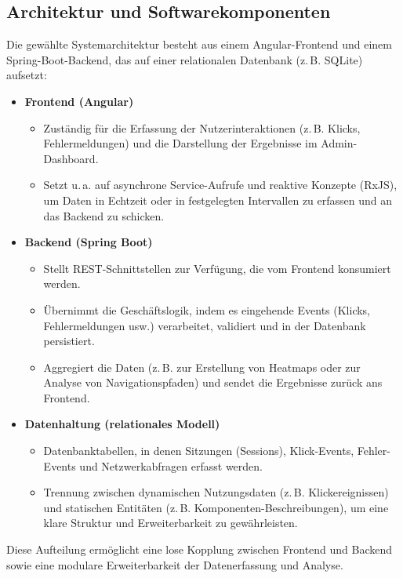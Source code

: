 \documentclass[12pt,oneside]{article}
\begin{document}
\subsection{Architektur und Softwarekomponenten}

Die gewählte Systemarchitektur besteht aus einem Angular-Frontend und einem Spring-Boot-Backend, das auf einer relationalen Datenbank (z.\,B. SQLite) aufsetzt:

\begin{itemize}
    \item \textbf{Frontend (Angular)}
    \begin{itemize}
        \item Zuständig für die Erfassung der Nutzerinteraktionen (z.\,B. Klicks, Fehlermeldungen) und die Darstellung der Ergebnisse im Admin-Dashboard.
        \item Setzt u.\,a. auf asynchrone Service-Aufrufe und reaktive Konzepte (RxJS), um Daten in Echtzeit oder in festgelegten Intervallen zu erfassen und an das Backend zu schicken.
    \end{itemize}
    \item \textbf{Backend (Spring Boot)}
    \begin{itemize}
        \item Stellt REST-Schnittstellen zur Verfügung, die vom Frontend konsumiert werden.
        \item Übernimmt die Geschäftslogik, indem es eingehende Events (Klicks, Fehlermeldungen usw.) verarbeitet, validiert und in der Datenbank persistiert.
        \item Aggregiert die Daten (z.\,B. zur Erstellung von Heatmaps oder zur Analyse von Navigationspfaden) und sendet die Ergebnisse zurück ans Frontend.
    \end{itemize}
    \item \textbf{Datenhaltung (relationales Modell)}
    \begin{itemize}
        \item Datenbanktabellen, in denen Sitzungen (Sessions), Klick-Events, Fehler-Events und Netzwerkabfragen erfasst werden.
        \item Trennung zwischen dynamischen Nutzungsdaten (z.\,B. Klickereignissen) und statischen Entitäten (z.\,B. Komponenten-Beschreibungen), um eine klare Struktur und Erweiterbarkeit zu gewährleisten.
    \end{itemize}
\end{itemize}

Diese Aufteilung ermöglicht eine lose Kopplung zwischen Frontend und Backend sowie eine modulare Erweiterbarkeit der Datenerfassung und Analyse.
\end{document}
